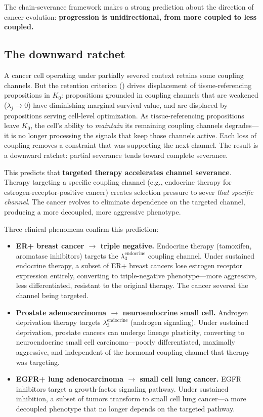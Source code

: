 \documentclass[11pt]{article}
\theoremstyle{definition}
\theoremstyle{remark}
\begin{document}
The chain-severance framework makes a strong prediction about the
direction of cancer evolution: \textbf{progression is unidirectional,
from more coupled to less coupled.}

\subsection{The downward ratchet}

A cancer cell operating under partially severed context retains some
coupling channels. But the retention criterion
(\cite{McCarthy2026c}) drives displacement of tissue-referencing
propositions in $K_0$: propositions grounded in coupling channels
that are weakened ($\lambda_j \to 0$) have diminishing marginal
survival value, and are displaced by propositions serving cell-level
optimization. As tissue-referencing propositions leave $K_0$, the
cell's ability to \emph{maintain} its remaining coupling channels
degrades---it is no longer processing the signals that keep those
channels active. Each loss of coupling removes a constraint that
was supporting the next channel. The result is a downward ratchet:
partial severance tends toward complete severance.

This predicts that \textbf{targeted therapy accelerates channel
severance}. Therapy targeting a specific coupling channel
(e.g., endocrine therapy for estrogen-receptor-positive cancer)
creates selection pressure to sever \emph{that specific channel}.
The cancer evolves to eliminate dependence on the targeted channel,
producing a more decoupled, more aggressive phenotype.

Three clinical phenomena confirm this prediction:
\begin{itemize}
\item \textbf{ER+ breast cancer $\to$ triple negative.}
   Endocrine therapy (tamoxifen, aromatase inhibitors) targets the
   $\lambda_3^{\mathrm{endocrine}}$ coupling channel. Under sustained
   endocrine therapy, a subset of ER+ breast cancers lose estrogen
   receptor expression entirely, converting to triple-negative
   phenotype---more aggressive, less differentiated, resistant to the
   original therapy. The cancer severed the channel being targeted.

\item \textbf{Prostate adenocarcinoma $\to$ neuroendocrine small cell.}
   Androgen deprivation therapy targets
   $\lambda_3^{\mathrm{endocrine}}$ (androgen signaling). Under
   sustained deprivation, prostate cancers can undergo lineage
   plasticity, converting to neuroendocrine small cell
   carcinoma---poorly differentiated, maximally aggressive, and
   independent of the hormonal coupling channel that therapy was
   targeting.

\item \textbf{EGFR+ lung adenocarcinoma $\to$ small cell lung cancer.}
   EGFR inhibitors target a growth-factor signaling pathway. Under
   sustained inhibition, a subset of tumors transform to small cell
   lung cancer---a more decoupled phenotype that no longer depends
   on the targeted pathway.
\end{itemize}
\end{document}
